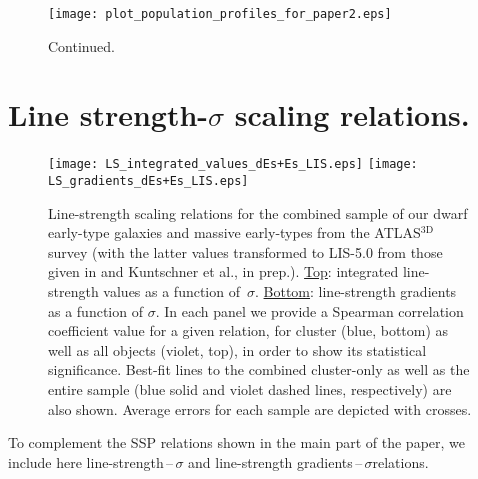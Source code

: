 \documentclass[useAMS,usenatbib]{mn2e}
\newcommand{\sig}{$\sigma$}
\newcommand{\atlas}{ATLAS$^{\mathrm{3D}}$}
\begin{document}
\begin{figure*}
\begin{fullpage}
\centering
\texttt{[image: plot\_population\_profiles\_for\_paper2.eps]}
\caption{Continued.}
\label{population_gradients2}  
\end{fullpage}
\end{figure*}

\section{Line strength-$\sigma$ scaling relations.}
\label{app-lines}

\begin{figure*}
\centering
\texttt{[image: LS\_integrated\_values\_dEs+Es\_LIS.eps]}
\texttt{[image: LS\_gradients\_dEs+Es\_LIS.eps]}

\caption{Line-strength scaling relations for the combined sample of our dwarf early-type galaxies and massive early-types from the {\atlas} survey (with the latter values transformed to LIS-5.0 from those given in \protect\citealt{mcdermid:2015} and Kuntschner et al., in prep.). \underline{Top}: integrated line-strength values as a function of~{\sig}. \underline{Bottom}: line-strength gradients as a function of {\sig}. In each panel we provide a Spearman correlation coefficient value for a given relation, for cluster (blue, bottom) as well as all objects (violet, top), in order to show its statistical significance. Best-fit lines to the combined cluster-only as well as the entire sample (blue solid and violet dashed lines, respectively) are also shown. Average errors for each sample are depicted with crosses.}

\label{gradients_integrated_relation}  
\end{figure*}

To complement the SSP relations shown in the main part of the paper, we include here line-strength\,--\,{\sig} and line-strength gradients\,--\,{\sig}relations.

\label{lastpage}
\end{document}
